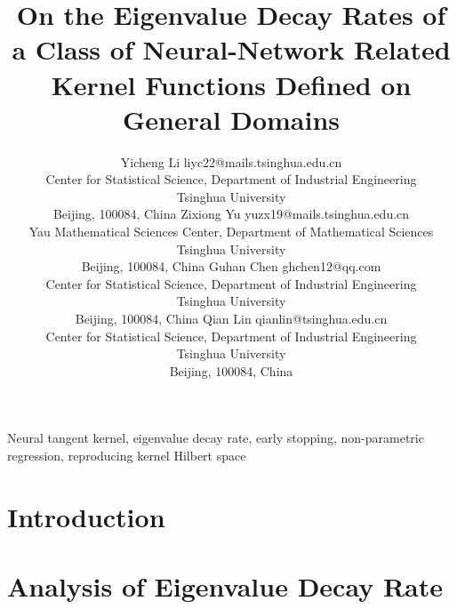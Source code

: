 \documentclass[twoside,11pt]{article}
\begin{document}
  \title{On the Eigenvalue Decay Rates of a Class of Neural-Network Related Kernel Functions Defined on General Domains}

  \author{\name Yicheng Li \email liyc22@mails.tsinghua.edu.cn \\
  \addr Center for Statistical Science, Department of Industrial Engineering\\
  Tsinghua University\\
  Beijing, 100084, China
  \AND
  \name Zixiong Yu \email yuzx19@mails.tsinghua.edu.cn \\
  \addr Yau Mathematical Sciences Center, Department of Mathematical Sciences\\
  Tsinghua University\\
  Beijing, 100084, China
  \AND Guhan Chen \email ghchen12@qq.com \\
  \addr Center for Statistical Science, Department of Industrial Engineering\\
  Tsinghua University\\
  Beijing, 100084, China
  \AND Qian Lin \email qianlin@tsinghua.edu.cn \\
  \addr Center for Statistical Science, Department of Industrial Engineering\\
  Tsinghua University\\
  Beijing, 100084, China
  }


  \maketitle

  \begin{abstract}%
    
  \end{abstract}

  \begin{keywords}
    Neural tangent kernel, eigenvalue decay rate, early stopping, non-parametric regression, reproducing kernel Hilbert space
  \end{keywords}


  \section{Introduction}\label{sec:intro}
  


  \section{Analysis of Eigenvalue Decay Rate}\label{sec:NTK}
  
\end{document}
